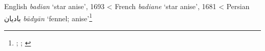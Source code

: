 \begin{etymology}\label{ety:badian}
English \textit{badian} `star anise', 1693
< French \textit{badiane} `star anise', 1681
< Persian {بادیان} \textit{bādyān} `fennel; anise'\footnote{\textcite{oed}; \textcite{tlfi}; \textcites[140]{steingass_comprehensive_1892}[197]{hayyim_new_1934}}
\end{etymology}